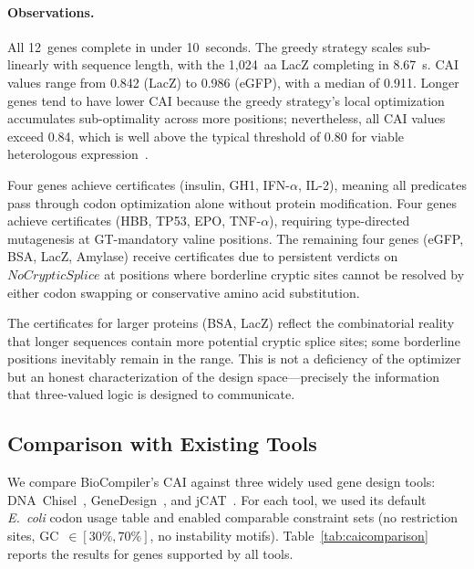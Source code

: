 \paragraph{Observations.}
All 12~genes complete in under 10~seconds.  The greedy strategy scales
sub-linearly with sequence length, with the 1,024~aa LacZ completing in
8.67~s.  CAI values range from 0.842 (LacZ) to 0.986 (eGFP), with a
median of 0.911.  Longer genes tend to have lower CAI because the
greedy strategy's local optimization accumulates sub-optimality across
more positions; nevertheless, all CAI values exceed 0.84, which is
well above the typical threshold of 0.80 for viable heterologous
expression~\cite{puig2007optimizer}.

Four genes achieve \GOLD{} certificates (insulin, GH1, IFN-$\alpha$,
IL-2), meaning all predicates pass through codon optimization alone
without protein modification.  Four genes achieve \SILVER{} certificates
(HBB, TP53, EPO, TNF-$\alpha$), requiring type-directed mutagenesis at
GT-mandatory valine positions.  The remaining four genes (eGFP, BSA,
LacZ, Amylase) receive \BRONZE{} certificates due to persistent
\UNCERTAIN{} verdicts on $\mathit{NoCrypticSplice}$ at positions where
borderline cryptic sites cannot be resolved by either codon swapping or
conservative amino acid substitution.

The \BRONZE{} certificates for larger proteins (BSA, LacZ) reflect the
combinatorial reality that longer sequences contain more potential
cryptic splice sites; some borderline positions inevitably remain in the
\UNCERTAIN{} range.  This is not a deficiency of the optimizer but an
honest characterization of the design space---precisely the information
that three-valued logic is designed to communicate.

\subsection{Comparison with Existing Tools}\label{sec:comparison}

We compare BioCompiler's CAI against three widely used gene design tools:
DNA~Chisel~\cite{piret2020dnachisel},
GeneDesign~\cite{richardson2006genedesign}, and
jCAT~\cite{gage2006jcat}.  For each tool, we used its default
\emph{E.~coli} codon usage table and enabled comparable constraint sets
(no restriction sites, GC~$\in [30\%, 70\%]$, no instability motifs).
Table~\ref{tab:caicomparison} reports the results for genes supported by
all tools.

